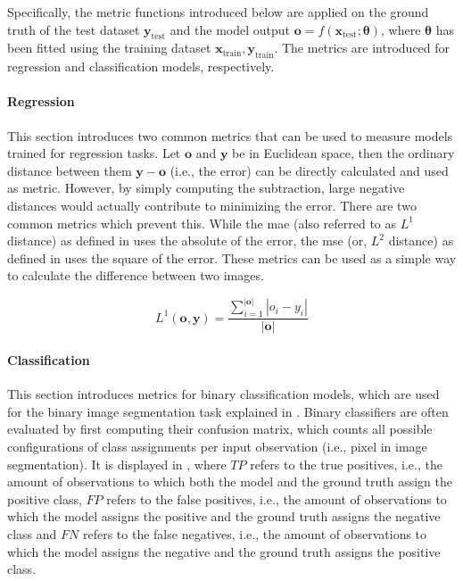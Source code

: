 Specifically, the metric functions introduced below are applied on the ground truth of the test dataset $\mathbf{y}_\text{test}$ and the model output $\mathbf{o}=f(\textbf{x}_\text{test};\boldsymbol{\theta})$, where $\boldsymbol{\theta}$ has been fitted using the training dataset $\mathbf{x}_\text{train}, \mathbf{y}_\text{train}$. The metrics are introduced for regression and classification models, respectively.

\paragraph{Regression}
This section introduces two common metrics that can be used to measure models trained for regression tasks. Let $\mathbf{o}$ and $\mathbf{y}$ be in Euclidean space, then the ordinary distance between them $\mathbf{y}-\mathbf{o}$ (i.e., the error) can be directly calculated and used as metric. However, by simply computing the subtraction, large negative distances would actually contribute to minimizing the error. There are two common metrics which prevent this. While the \gls{mae} (also referred to as $L^1$ distance) as defined in  uses the absolute of the error, the \gls{mse} (or, $L^2$ distance) as defined in  uses the square of the error. These metrics can be used as a simple way to calculate the difference between two images.

\begin{equation}
\label{eq:mae}
    L^1(\textbf{o}, \textbf{y}) = \frac{\sum_{i=1}^{|\textbf{o}|} |o_i - y_i|}{|\mathbf{o}|}
\end{equation}

\paragraph{Classification}
This section introduces metrics for binary classification models, which are used for the binary image segmentation task explained in . Binary classifiers are often evaluated by first computing their confusion matrix, which counts all possible configurations of class assignments per input observation (i.e., pixel in image segmentation). It is displayed in , where $TP$ refers to the true positives, i.e., the amount of observations to which both the model and the ground truth assign the positive class, $FP$ refers to the false positives, i.e., the amount of observations to which the model assigns the positive and the ground truth assigns the negative class and $FN$ refers to the false negatives, i.e., the amount of observations to which the model assigns the negative and the ground truth assigns the positive class.

